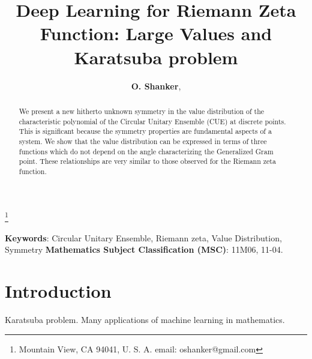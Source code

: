 \documentclass[twoside]{article}
\begin{document}


\newtheorem{theorem}{Theorem}[section]
\newtheorem{lemma}[theorem]{Lemma}

\theoremstyle{definition}
\newtheorem{definition}[theorem]{Definition}
\newtheorem{example}[theorem]{Example}
\newtheorem{xca}[theorem]{Exercise}

\theoremstyle{remark}
\newtheorem{remark}[theorem]{Remark}



\date{}
\lhead[]{}
\rhead[]{}

\title{\bf{Deep Learning for Riemann Zeta Function: Large Values and Karatsuba problem}}

\maketitle


\author{{\textbf{O. Shanker}},}
\thanks{ Mountain View, CA 94041, U. S. A. email: oshanker@gmail.com}

\thispagestyle{fancy}

\begin{abstract}
We present a new hitherto unknown symmetry in the value
distribution of the characteristic polynomial of the Circular Unitary Ensemble (CUE)
 at discrete points. This is significant because the symmetry properties
are fundamental aspects of a system. We show that the value distribution 
can be expressed in terms of three functions 
which do not depend on the angle characterizing the Generalized Gram point.
These relationships are very similar to those  observed for 
the Riemann zeta function.
\end{abstract}
{\textbf {Keywords}:} Circular Unitary Ensemble, Riemann zeta, Value Distribution, Symmetry 
{\textbf {Mathematics Subject Classification (MSC)}:} 11M06, 11-04.


\symbolfootnote[0]{*}


\section{Introduction}

Karatsuba problem.  Many applications of machine learning in mathematics.
\end{document}
